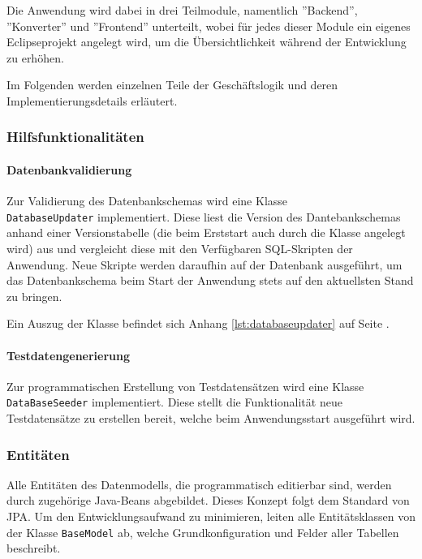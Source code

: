 \documentclass[12pt, xcolor=dvipsnames]{scrartcl}
\begin{document}
Die Anwendung wird dabei in drei Teilmodule, namentlich ''Backend'', ''Konverter'' und ''Frontend'' unterteilt, wobei für jedes dieser Module ein eigenes Eclipseprojekt angelegt wird, um die Übersichtlichkeit während der Entwicklung zu erhöhen.

Im Folgenden werden einzelnen Teile der Geschäftslogik und deren Implementierungsdetails erläutert.

\subsubsection*{Hilfsfunktionalitäten}

\paragraph*{Datenbankvalidierung}
Zur Validierung des Datenbankschemas wird eine Klasse \\\texttt{DatabaseUpdater} implementiert. Diese liest die Version des Dantebankschemas anhand einer Versionstabelle (die beim Erststart auch durch die Klasse angelegt wird) aus und vergleicht diese mit den Verfügbaren SQL-Skripten der Anwendung. Neue Skripte werden daraufhin auf der Datenbank ausgeführt, um das Datenbankschema beim Start der Anwendung stets auf den aktuellsten Stand zu bringen.

Ein Auszug der Klasse befindet sich Anhang \ref{lst:databaseupdater} auf Seite \pageref{lst:databaseupdater}.

\paragraph*{Testdatengenerierung}
Zur programmatischen Erstellung von Testdatensätzen wird eine Klasse \texttt{DataBaseSeeder} implementiert. Diese stellt die Funktionalität neue Testdatensätze zu erstellen bereit, welche beim Anwendungsstart ausgeführt wird.

\subsubsection*{Entitäten}

Alle Entitäten des Datenmodells, die programmatisch editierbar sind, werden durch zugehörige Java-Beans abgebildet. Dieses Konzept folgt dem Standard von JPA. Um den Entwicklungsaufwand zu minimieren, leiten alle Entitätsklassen von der Klasse \texttt{BaseModel} ab, welche Grundkonfiguration und Felder aller Tabellen beschreibt.
\end{document}
